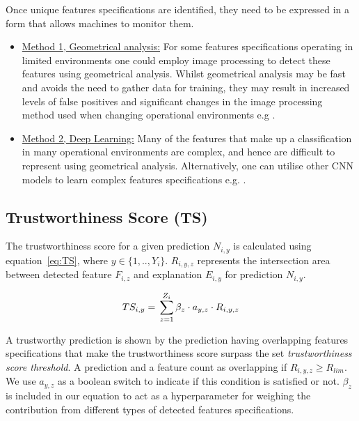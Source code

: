 Once unique features specifications are identified, they need to be expressed in a form that allows machines to  monitor them.
\begin{itemize}
\item \underline{Method 1, Geometrical analysis:} For some features specifications operating in limited environments one could employ image processing to detect these features using geometrical analysis. 
%
Whilst geometrical analysis may be fast and avoids the need to gather data for training, they may result in increased levels of false positives and significant changes in the image processing method used when changing operational environments e.g \cite{Lucian2018}. 

\item \underline{Method 2, Deep Learning:} Many of the features that make up a classification in many operational environments are complex, and hence are difficult to represent using geometrical analysis.
%
Alternatively, one can utilise other CNN models to learn complex features specifications e.g. \cite{Kazemi2014}\cite{Fahn2017}. 

\end{itemize}

\subsection{Trustworthiness Score (TS)}
The trustworthiness score for a given prediction $N_{i,y}$ is calculated using equation~\ref{eq:TS}, where $y\in\{1,..,Y_i\}$. 
%
$R_{i,y,z}$ represents the intersection area between detected feature $F_{i,z}$ and explanation $E_{i,y}$ for prediction $N_{i,y}$. 

\begin{equation}
\label{eq:TS}
    TS_{i,y} = \sideset{}{}\sum_{z=1}^{Z_i} \beta_z \cdot a_{y,z} \cdot R_{i,y,z}%
\end{equation}



A trustworthy prediction is shown by the prediction having overlapping features specifications that make the trustworthiness score surpass the set \textit{trustworthiness score threshold}. 
%
A prediction and a feature count as overlapping if $R_{i,y,z} \geq R_{lim}$. We use $a_{y,z}$ as a boolean switch to indicate if this condition is satisfied or not. $\beta_z$ is included in our equation to act as a hyperparameter for weighing the contribution from different types of detected features specifications.

